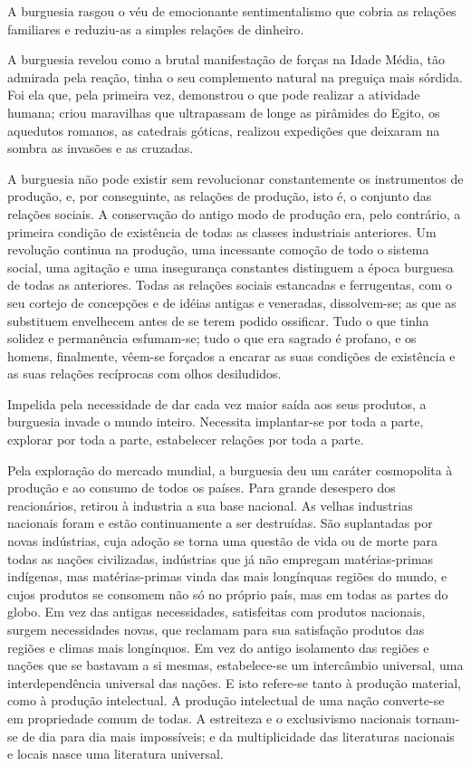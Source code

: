 A burguesia rasgou o véu de emocionante sentimentalismo que cobria as
relações familiares e reduziu-as a simples relações de dinheiro.

A burguesia revelou como a brutal manifestação de forças na Idade
Média, tão admirada pela reação, tinha o seu complemento natural na
preguiça mais sórdida. Foi ela que, pela primeira vez, demonstrou o
que pode realizar a atividade humana; criou maravilhas que ultrapassam
de longe as pirâmides do Egito, os aquedutos romanos, as catedrais
góticas, realizou expedições que deixaram na sombra as invasões e as
cruzadas.

A burguesia não pode existir sem revolucionar constantemente os
instrumentos de produção, e, por conseguinte, as relações de produção,
isto é, o conjunto das relações sociais. A conservação do antigo modo
de produção era, pelo contrário, a primeira condição de existência de
todas as classes industriais anteriores. Um revolução continua na
produção, uma incessante comoção de todo o sistema social, uma
agitação e uma insegurança constantes distinguem a época burguesa de
todas as anteriores. Todas as relações sociais estancadas e
ferrugentas, com o seu cortejo de concepções e de idéias antigas e
veneradas, dissolvem-se; as que as substituem envelhecem antes de se
terem podido ossificar. Tudo o que tinha solidez e permanência
esfumam-se; tudo o que era sagrado é profano, e os homens, finalmente,
vêem-se forçados a encarar as suas condições de existência e as suas
relações recíprocas com olhos desiludidos.

Impelida pela necessidade de dar cada vez maior saída aos seus
produtos, a burguesia invade o mundo inteiro. Necessita implantar-se
por toda a parte, explorar por toda a parte, estabelecer relações por
toda a parte.

Pela exploração do mercado mundial, a burguesia deu um caráter
cosmopolita à produção e ao consumo de todos os países. Para grande
desespero dos reacionários, retirou à industria a sua base
nacional. As velhas industrias nacionais foram e estão continuamente a
ser destruídas. São suplantadas por novas indústrias, cuja adoção se
torna uma questão de vida ou de morte para todas as nações
civilizadas, indústrias que já não empregam matérias-primas indígenas,
mas matérias-primas vinda das mais longínquas regiões do mundo, e
cujos produtos se consomem não só no próprio país, mas em todas as
partes do globo. Em vez das antigas necessidades, satisfeitas com
produtos nacionais, surgem necessidades novas, que reclamam para sua
satisfação produtos das regiões e climas mais longínquos. Em vez do
antigo isolamento das regiões e nações que se bastavam a si mesmas,
estabelece-se um intercâmbio universal, uma interdependência universal
das nações. E isto refere-se tanto à produção material, como à
produção intelectual. A produção intelectual de uma nação converte-se
em propriedade comum de todas. A estreiteza e o exclusivismo nacionais
tornam-se de dia para dia mais impossíveis; e da multiplicidade das
literaturas nacionais e locais nasce uma literatura universal.

